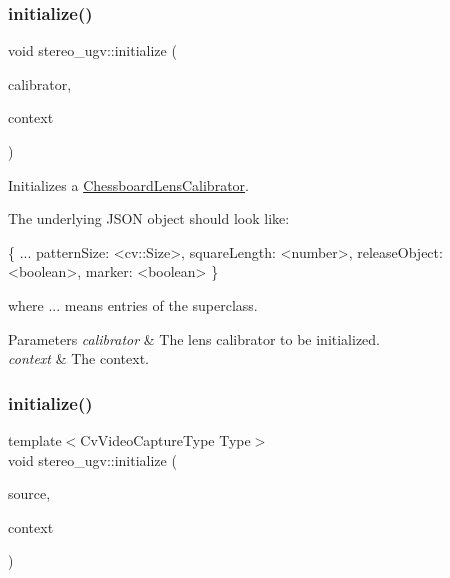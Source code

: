 \subsubsection{\texorpdfstring{initialize()}{initialize()}\hspace{0.1cm}{\footnotesize\ttfamily [7/8]}}
{\footnotesize\ttfamily void stereo\+\_\+ugv\+::initialize (\begin{DoxyParamCaption}\item[{\hyperlink{classstereo__ugv_1_1ChessboardLensCalibrator}{Chessboard\+Lens\+Calibrator} $\ast$}]{calibrator,  }\item[{const \hyperlink{classstereo__ugv_1_1Context}{Context} \&}]{context }\end{DoxyParamCaption})}



Initializes a \hyperlink{classstereo__ugv_1_1ChessboardLensCalibrator}{Chessboard\+Lens\+Calibrator}. 

The underlying J\+S\+ON object should look like\+: 
\begin{DoxyCode}
\{
  ...
  patternSize: <cv::Size>,
  squareLength: <number>,
  releaseObject: <\textcolor{keywordtype}{boolean}>,
  marker: <\textcolor{keywordtype}{boolean}>
\}
\end{DoxyCode}
 where ... means entries of the superclass. 
\begin{DoxyParams}{Parameters}
{\em calibrator} & The lens calibrator to be initialized. \\
\hline
{\em context} & The context. \\
\hline
\end{DoxyParams}
\mbox{\label{namespacestereo__ugv_acaec0936792769b5d676773f7d4070cd}} 
\subsubsection{\texorpdfstring{initialize()}{initialize()}\hspace{0.1cm}{\footnotesize\ttfamily [8/8]}}
{\footnotesize\ttfamily template$<$Cv\+Video\+Capture\+Type Type$>$ \\
void stereo\+\_\+ugv\+::initialize (\begin{DoxyParamCaption}\item[{\hyperlink{classstereo__ugv_1_1CvVideoCaptureImageSource}{Cv\+Video\+Capture\+Image\+Source}$<$ Type $>$ $\ast$}]{source,  }\item[{const \hyperlink{classstereo__ugv_1_1Context}{Context} \&}]{context }\end{DoxyParamCaption})\hspace{0.3cm}{\ttfamily [inline]}}



